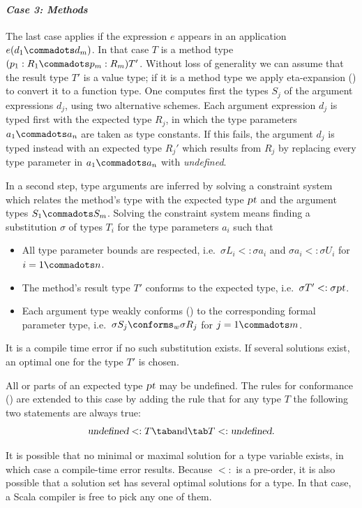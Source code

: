 \paragraph{\em Case 3: Methods} The last case applies if the expression
$e$ appears in an application $e(d_1 \commadots d_m)$. In that case
$T$ is a method type $(p_1:R_1 \commadots p_m:R_m)T'$. Without loss of
generality we can assume that the result type $T'$ is a value type; if
it is a method type we apply eta-expansion () to
convert it to a function type.  One computes first the types $S_j$ of
the argument expressions $d_j$, using two alternative schemes.  Each
argument expression $d_j$ is typed first with the expected type $R_j$,
in which the type parameters $a_1 \commadots a_n$ are taken as type
constants.  If this fails, the argument $d_j$ is typed instead with an
expected type $R_j'$ which results from $R_j$ by replacing every type
parameter in $a_1 \commadots a_n$ with {\sl undefined}.

In a second step, type arguments are inferred by solving a constraint
system which relates the method's type with the expected type
$\mbox{\sl pt}$ and the argument types $S_1 \commadots S_m$. Solving the
constraint system means
finding a substitution $\sigma$ of types $T_i$ for the type parameters
$a_i$ such that
\begin{itemize}
\item 
All type parameter bounds are respected, i.e.\ 
$\sigma L_i <: \sigma a_i$ and $\sigma a_i <: \sigma U_i$ for $i = 1 \commadots n$.
\item 
The method's result type $T'$ conforms to the expected type, i.e.\ 
$\sigma T' <: \sigma \mbox{\sl pt}$.
\item
Each argument type weakly conforms () 
to the corresponding formal parameter
type, i.e.\ 
$\sigma S_j \conforms_w \sigma R_j$ for $j = 1 \commadots m$.
\end{itemize}
It is a compile time error if no such substitution exists.  If several
solutions exist, an optimal one for the type $T'$ is chosen.

All or parts of an expected type $\mbox{\sl pt}$ may be undefined. The rules for
conformance (\sref{sec:conformance}) are extended to this case by adding
the rule that for any type $T$ the following two statements are always
true:
\[
   \mbox{\sl undefined} <: T \tab\mbox{and}\tab T <: \mbox{\sl undefined} .
\]

It is possible that no minimal or maximal solution for a type variable
exists, in which case a compile-time error results. Because $<:$ is a
pre-order, it is also possible that a solution set has several optimal
solutions for a type. In that case, a Scala compiler is free to pick
any one of them.

